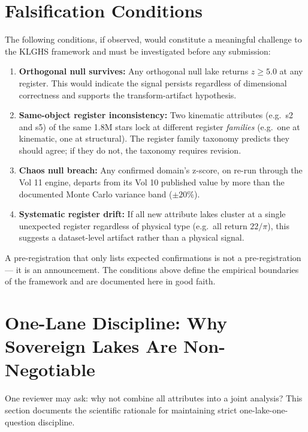 \documentclass[12pt,a4paper]{article}
\begin{document}
\section{Falsification Conditions}
\label{sec:falsification}

The following conditions, if observed, would constitute a meaningful challenge
to the KLGHS framework and must be investigated before any submission:

\begin{enumerate}
  \item \textbf{Orthogonal null survives:} Any orthogonal null lake returns
  $z \geq 5.0$ at any register. This would indicate the signal persists
  regardless of dimensional correctness and supports the transform-artifact
  hypothesis.
  \item \textbf{Same-object register inconsistency:} Two kinematic attributes
  (e.g.\ s2 and s5) of the same 1.8M stars lock at different register
  \emph{families} (e.g.\ one at kinematic, one at structural). The register
  family taxonomy predicts they should agree; if they do not, the taxonomy
  requires revision.
  \item \textbf{Chaos null breach:} Any confirmed domain's z-score, on
  re-run through the Vol 11 engine, departs from its Vol 10 published value
  by more than the documented Monte Carlo variance band ($\pm 20\%$).
  \item \textbf{Systematic register drift:} If all new attribute lakes cluster
  at a single unexpected register regardless of physical type (e.g.\ all return
  $22/\pi$), this suggests a dataset-level artifact rather than a physical
  signal.
\end{enumerate}

A pre-registration that only lists expected confirmations is not a pre-registration
--- it is an announcement. The conditions above define the empirical boundaries
of the framework and are documented here in good faith.

\section{One-Lane Discipline: Why Sovereign Lakes Are Non-Negotiable}
\label{sec:one_lane}

One reviewer may ask: why not combine all attributes into a joint analysis?
This section documents the scientific rationale for maintaining strict
one-lake-one-question discipline.
\end{document}
